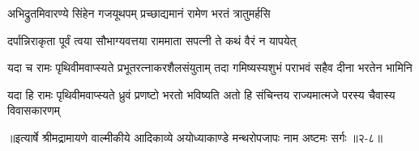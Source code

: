 \twolineshloka
{अभिद्रुतमिवारण्ये सिंहेन गजयूथपम्}
{प्रच्छाद्यमानं रामेण भरतं त्रातुमर्हसि} %

\twolineshloka
{दर्पान्निराकृता पूर्वं त्वया सौभाग्यवत्तया}
{राममाता सपत्नी ते कथं वैरं न यापयेत्} %

\twolineshloka
{यदा च रामः पृथिवीमवाप्स्यते प्रभूतरत्नाकरशैलसंयुताम्}
{तदा गमिष्यस्यशुभं पराभवं सहैव दीना भरतेन भामिनि} %

\twolineshloka
{यदा हि रामः पृथिवीमवाप्स्यते ध्रुवं प्रणष्टो भरतो भविष्यति}
{अतो हि संचिन्तय राज्यमात्मजे परस्य चैवास्य विवासकारणम्} %


॥इत्यार्षे श्रीमद्रामायणे वाल्मीकीये आदिकाव्ये अयोध्याकाण्डे मन्थरोपजापः नाम अष्टमः सर्गः ॥२-८॥
